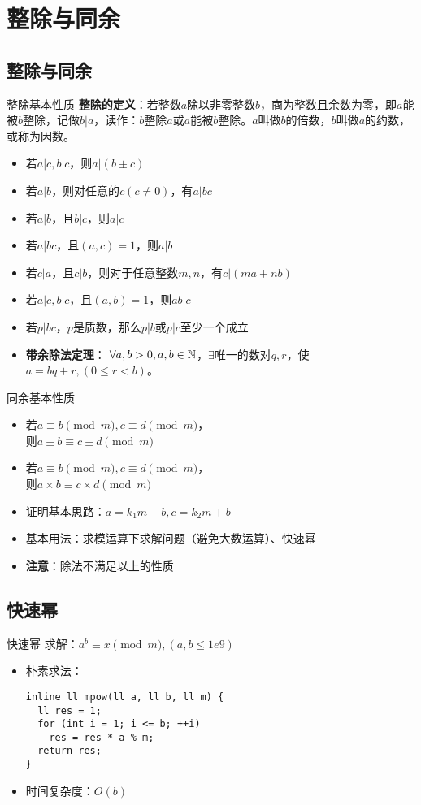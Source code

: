 \section{整除与同余}
\subsection{整除与同余}
\begin{frame}{整除基本性质}
\textbf{整除的定义}：若整数$a$除以非零整数$b$，商为整数且余数为零，即$a$能被$b$整除，记做$b|a$，读作：$b$整除$a$或$a$能被$b$整除。$a$叫做$b$的倍数，$b$叫做$a$的约数，或称为因数。
\pause
\begin{itemize}
  \item 若$a|c,b|c$，则$a|(b\pm c)$
  \item 若$a|b$，则对任意的$c(c\neq 0)$，有$a|bc$
  \item 若$a|b$，且$b|c$，则$a|c$
  \item 若$a|bc$，且$(a,c)=1$，则$a|b$
  \item 若$c|a$，且$c|b$，则对于任意整数$m,n$，有$c|(ma+nb)$
  \item 若$a|c,b|c$，且$(a,b)=1$，则$ab|c$
  \item 若$p|bc$，$p$是质数，那么$p|b$或$p|c$至少一个成立
  \item \textbf{带余除法定理}： $\forall a,b>0, a,b\in \mathbb{N}$，$\exists$唯一的数对$q,r$，使$a=bq+r,(0\leq r<b)$。
\end{itemize}
\end{frame}


\begin{frame}{同余基本性质}
\begin{itemize}
  \item 若$a\equiv b\pmod{m},c\equiv d\pmod{m}$，\\则$a\pm b\equiv c\pm d\pmod{m}$
  \item 若$a\equiv b\pmod{m},c\equiv d\pmod{m}$，\\则$a\times b\equiv c\times d\pmod{m}$ \pause
  \item 证明基本思路：$a=k_1m+b,c=k_2m+b$ \pause
  \item 基本用法：求模运算下求解问题（避免大数运算）、快速幂 \pause
  \item \textbf{注意}：除法不满足以上的性质
\end{itemize}
\end{frame}

\subsection{快速幂}
\begin{frame}[fragile]{快速幂}
  求解：$a^b\equiv x\pmod{m},(a,b\leq 1e9)$
  \vspace{0.5cm}
  \pause
\begin{itemize}
  \item 朴素求法：
\begin{lstlisting}
inline ll mpow(ll a, ll b, ll m) {
  ll res = 1;
  for (int i = 1; i <= b; ++i) 
    res = res * a % m;
  return res;
}
\end{lstlisting}
  \item 时间复杂度：$O(b)$
\end{itemize}
\end{frame}


